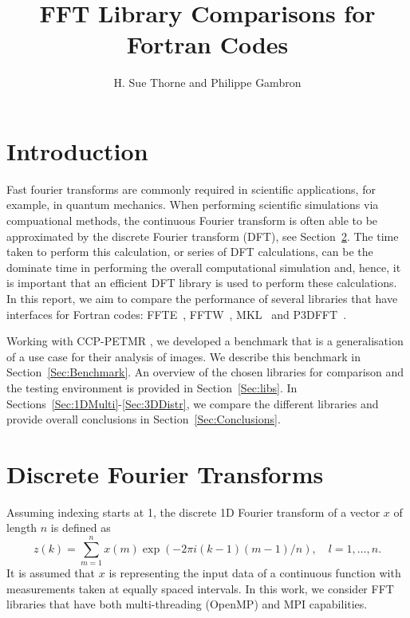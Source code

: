 \documentclass[a4paper]{article}
\begin{document}
\title{FFT Library Comparisons for Fortran Codes}
\author{H. Sue Thorne and Philippe Gambron}

\maketitle


\section{Introduction}

Fast fourier transforms are commonly required in scientific
applications, for example, in quantum mechanics. When performing
scientific simulations via compuational methods, the continuous
Fourier transform is often able to be approximated by the discrete
Fourier transform (DFT), see Section~\ref{Sec:FFT}. The time taken to
perform this calculation, or series of DFT calculations, can be the
dominate time in performing the overall computational simulation and,
hence, it is important that an efficient DFT library is used to
perform these calculations. In this report, we aim to compare the
performance of several libraries that have interfaces for Fortran
codes: FFTE~\cite{FFTE}, FFTW~\cite{FFTW}, MKL~\cite{MKL} and
P3DFFT~\cite{P3DFFT}.

Working with CCP-PETMR \cite{PETMR}, we developed a benchmark that is
a generalisation of a use case for their analysis of images. We
describe this benchmark in Section~\ref{Sec:Benchmark}. An overview of
the chosen libraries for comparison and the testing environment is
provided in Section~\ref{Sec:libs}. In
Sections~\ref{Sec:1DMulti}-\ref{Sec:3DDistr}, we compare the different
libraries and provide overall conclusions in
Section~\ref{Sec:Conclusions}.



\section{Discrete Fourier Transforms}\label{Sec:FFT}


Assuming indexing starts at 1, the discrete 1D Fourier transform of a
vector $x$ of length $n$ is defined as
\begin{equation}\label{Eqn:fft}
  z(k) = \sum_{m=1}^{n} x(m) \exp(-2\pi i (k-1) (m-1) / n), \quad l=1,\ldots,n.
\end{equation}
It is assumed that $x$ is representing the input data of a continuous function with measurements taken at equally spaced intervals. In this work, we consider FFT libraries that have both multi-threading
(OpenMP) and MPI capabilities.
\end{document}

